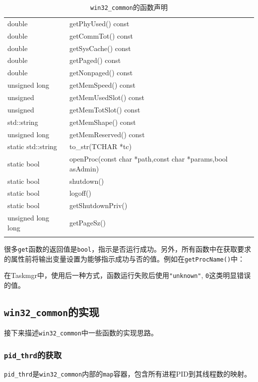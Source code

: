 \documentclass[UTF8,twoside,titlepage]{ctexart}
\newcommand\code[1]{\texttt{#1}}
\begin{document}
{\begin{longtable}{>{\raggedleft\arraybackslash}p{18em}p{24em}}
        double & getPhyUsed() const \\
        double & getCommTot() const \\
        double & getSysCache() const \\
        double & getPaged() const \\
        double & getNonpaged() const \\
        unsigned long & getMemSpeed() const \\
        unsigned & getMemUsedSlot() const \\
        unsigned & getMemTotSlot() const \\
        std::string & getMemShape() const \\
        unsigned long & getMemReserved() const \\
        static std::string & to\_str(TCHAR *tc) \\
        static bool & openProc(const char *path,const char *params,bool asAdmin) \\
        static bool & shutdown() \\
        static bool & logoff() \\
        static bool & getShutdownPriv() \\
        unsigned long long & getPageSz() \\
        \hline
    \caption{\code{win32\_common}的函数声明}
    \label{table:win32func}
    \end{longtable}
}

很多\code{get}函数的返回值是\code{bool}，指示是否运行成功。另外，所有函数中在获取要求的属性前将输出变量设置为能够指示成功与否的值。例如在\code{getProcName()}中：

{
    \ttfamily
    
}

在Taskmgr中，使用后一种方式，函数运行失败后使用\code{"unknown"}, \code{0}这类明显错误的值。

\subsection{\code{win32\_common}的实现}

接下来描述\code{win32\_common}中一些函数的实现思路。

\subsubsection{\code{pid\_thrd}的获取}
\code{pid\_thrd}是\code{win32\_common}内部的\code{map}容器，包含所有进程PID到其线程数的映射。
\end{document}
